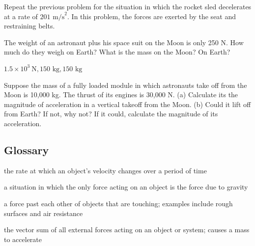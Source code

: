 \documentclass[
]{book}
\providecommand{\tightlist}{%
  \setlength{\itemsep}{0pt}\setlength{\parskip}{0pt}}
\begin{document}
\hypertarget{fs-id1849611}{}
\leavevmode{}%
Repeat the previous problem for the situation in which the rocket sled
decelerates at a rate of \({2\text{01\ m/s}^{2}}{}\). In this problem, the
forces are exerted by the seat and restraining belts.

\hypertarget{fs-id3244376}{}
\leavevmode{}%
The weight of an astronaut plus his space suit on the Moon is only 250
N. How much do they weigh on Earth? What is the mass on the Moon? On
Earth?

\leavevmode{}%
\(1.5 \times 10^{3}\ \text{N},\text{150\ kg},\text{150\ kg}\)

\hypertarget{fs-id1418924}{}
\leavevmode{}%
Suppose the mass of a fully loaded module in which astronauts take off
from the Moon is 10,000 kg. The thrust of its engines is 30,000 N. (a)
Calculate its the magnitude of acceleration in a vertical takeoff from
the Moon. (b) Could it lift off from Earth? If not, why not? If it
could, calculate the magnitude of its acceleration.

\hypertarget{glossary-13}{%
\subsection{Glossary}\label{glossary-13}}

\begin{description}
\tightlist
\item[acceleration]
the rate at which an object's velocity changes over a period of time
\end{description}

\begin{description}
\tightlist
\item[free-fall]
a situation in which the only force acting on an object is the force
due to gravity
\end{description}

\begin{description}
\tightlist
\item[friction]
a force past each other of objects that are touching; examples
include rough surfaces and air resistance
\end{description}

\begin{description}
\tightlist
\item[net external force]
the vector sum of all external forces acting on an object or system;
causes a mass to accelerate
\end{description}
\end{document}
